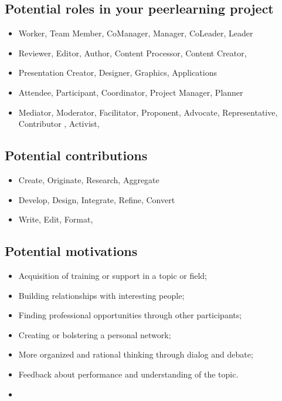 \hypertarget{potential-roles-in-your-peerlearning-project}{%
\subsection{Potential roles in your peer­learning
project}\label{potential-roles-in-your-peerlearning-project}}

\begin{itemize}
\tightlist
\item
  Worker, Team Member, Co­Manager, Manager, Co­Leader, Leader
\item
  Reviewer, Editor, Author, Content Processor, Content Creator,
\item
  Presentation Creator, Designer, Graphics, Applications
\item
  Attendee, Participant, Coordinator, Project Manager, Planner
\item
  Mediator, Moderator, Facilitator, Proponent, Advocate, Representative,
  Contributor , Activist,
  {~~~~~~~~~~~~~~~~~~~~~~~~~~~~~~~~~~~~~~~~~~~~~~~~}
\end{itemize}

\hypertarget{potential-contributions}{%
\subsection{Potential contributions}\label{potential-contributions}}

\begin{itemize}
\tightlist
\item
  Create, Originate, Research, Aggregate
\item
  Develop, Design, Integrate, Refine, Convert
\item
  Write, Edit, Format,
  {~~~~~~~~~~~~~~~~~~~~~~~~~~~~~~~~~~~~~~~~~~~~~~~~}
\end{itemize}

\hypertarget{potential-motivations}{%
\subsection{Potential motivations}\label{potential-motivations}}

\begin{itemize}
\tightlist
\item
  Acquisition of training or support in a topic or field;
\item
  Building relationships with interesting people;
\item
  Finding professional opportunities through other participants;
\item
  Creating or bolstering a personal network;
\item
  More organized and rational thinking through dialog and debate;
\item
  Feedback about performance and understanding of the topic.
\item
  {~~~~~~~~~~~~~~~~~~~~~~~~~~~~~~~~~~~~~~~~~~~~~~~~~~~~~~~~~~~~~~~~~~~~~~~~~~~~~~~~~~~~~~~~~~~~~~~~~~~~~~~~~~~~~~~~~~~~~~~~~~~~~~~~}
\end{itemize}

